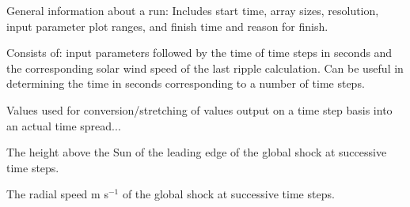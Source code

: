 \documentclass[12pt,a4paper]{article}
\begin{document}
  \vspace{0.5cm}
   
   \setlength{\temptextwidth}{\textwidth}  
  \addtolength{\temptextwidth}{-1.0\parindent}
    
    \parbox[t]{\temptextwidth}{General information about a run:
    Includes start time, array sizes, resolution, input parameter 
    plot ranges, and finish time and reason for finish.}  

   \vspace{0.5cm}
   
   \setlength{\temptextwidth}{\textwidth}   
  \addtolength{\temptextwidth}{-1.0\parindent}
    
    \parbox[t]{\temptextwidth}{Consists of: input parameters followed by the time of time steps in 
                               seconds and the corresponding solar wind speed of the 
                               last ripple calculation. Can be useful in determining the time in 
                               seconds corresponding to a number of time steps.}

    \vspace{0.5cm}
   
  \setlength{\temptextwidth}{\textwidth}  
  \addtolength{\temptextwidth}{-1.0\parindent}
    
    \parbox[t]{\temptextwidth}{Values used for conversion/stretching of values output on a 
                               time step basis into an actual time spread...}
  
   \vspace{0.5cm}
   
   \setlength{\temptextwidth}{\textwidth}   
  \addtolength{\temptextwidth}{-1.0\parindent}
   
    \parbox[t]{\temptextwidth}{The height above the Sun of the leading edge of the global shock 
                               at successive time steps.}
  
   \vspace{0.5cm}
   
  \setlength{\temptextwidth}{\textwidth}  
  \addtolength{\temptextwidth}{-1.0\parindent}
    
    \parbox[t]{\temptextwidth}{The radial speed m s$^{-1}$ of the global shock at successive time steps.}
 
  \vspace{0.5cm}
   
\end{document}
